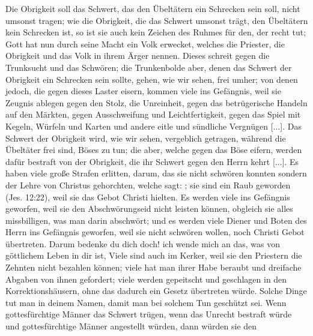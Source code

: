 {
    Die Obrigkeit soll 
    das Schwert, das den Übeltätern ein
    Schrecken sein soll, nicht umsonst tragen; wie die Obrigkeit, die
    das Schwert umsonst trägt, den Übeltätern kein Schrecken ist, so
    ist sie auch kein Zeichen des Ruhmes für den, der recht tut;
    Gott hat nun durch seine Macht ein Volk erwecket, welches
    die Priester, die Obrigkeit und das Volk in ihrem Ärger 
     nennen. Dieses schreit gegen die Trunksucht 
     und das Schwören;
    die Trunkenbolde aber, denen das Schwert der Obrigkeit ein
    Schrecken sein sollte, gehen, wie wir sehen, frei umher; von denen
    jedoch, die gegen dieses Laster eisern, kommen viele ins Gefängnis,
    weil sie Zeugnis ablegen gegen den Stolz, die Unreinheit, gegen
    das betrügerische Handeln auf den Märkten, gegen Ausschweifung
    und Leichtfertigkeit, gegen das Spiel mit 
    Kegeln, Würfeln und
    Karten und andere eitle und sündliche Vergnügen [...].
    Das Schwert der Obrigkeit wird, wie wir sehen, vergeblich 
    getragen, während die Übeltäter frei sind, Böses zu tun; die aber,
    welche gegen das Böse eifern, werden dafür bestraft von der
    Obrigkeit, die ihr Schwert gegen den Herrn kehrt [...]. Es haben
    viele große Strafen erlitten, darum, das sie nicht schwören konnten
    sondern der Lehre von Christus gehorchten, welche sagt: 
    ; sie sind 
    ein Raub geworden (Jes. 12:22),
    weil sie das Gebot Christi hielten. Es werden viele ins Gefängnis
    geworfen, weil sie den Abschwörungseid nicht leisten 
    können, obgleich
    sie alles missbilligen, was man darin abschwört; und es werden
    viele Diener und Boten des Herrn ins Gefängnis geworfen, weil sie
    nicht schwören wollen, noch Christi Gebot übertreten. Darum bedenke
    du dich doch! ich wende mich an das, was von göttlichem Leben
    in dir ist, Viele sind auch im Kerker, weil sie den Priestern die
    Zehnten nicht bezahlen können; viele 
    hat man ihrer Habe beraubt und
    dreifache Abgaben von ihnen gefordert; viele werden gepeitscht und
    geschlagen in den Korrektionshäusern, ohne das dadurch ein Gesetz
    übertreten würde. Solche Dinge tut man in deinem Namen, damit
    man bei solchem Tun geschützt sei. Wenn gottesfürchtige Männer
    das Schwert trügen, wenn das Unrecht bestraft würde und 
    gottesfürchtige Männer angestellt würden, dann würden sie den 
}
